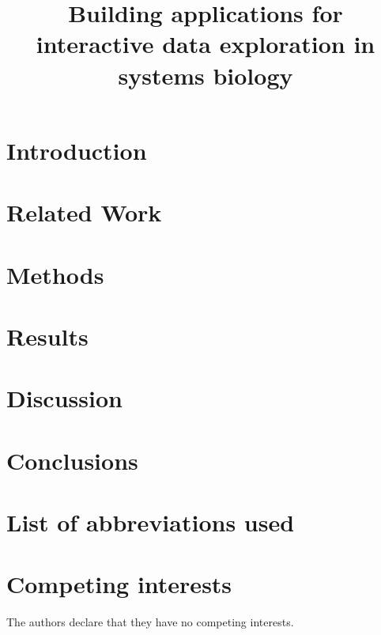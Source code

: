 \documentclass[sigconf]{acmart}
\begin{document}
\title{Building applications for interactive data exploration in systems biology}

 
 

\maketitle

\section*{Introduction}
 
\section*{Related Work}
 
\section*{Methods} 
 
\section*{Results}
 
\section*{Discussion} 
 
\section*{Conclusions}
 

\section*{List of abbreviations used}
\section*{Competing interests}
The authors declare that they have no competing interests.



\end{document}
